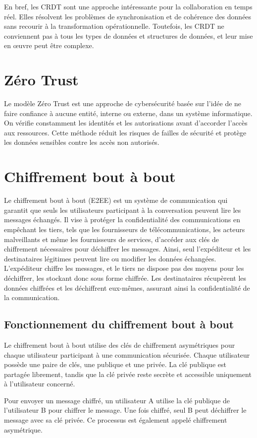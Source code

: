 En bref, les CRDT sont une approche intéressante pour la collaboration en temps réel. Elles résolvent les problèmes de synchronisation et de cohérence des données sans recourir à la transformation opérationnelle. Toutefois, les CRDT ne conviennent pas à tous les types de données et structures de données, et leur mise en œuvre peut être complexe.

\section{Zéro Trust}
Le modèle Zéro Trust est une approche de cybersécurité basée sur l'idée de ne faire confiance à aucune entité, interne ou externe, dans un système informatique. On vérifie constamment les identités et les autorisations avant d'accorder l'accès aux ressources. Cette méthode réduit les risques de failles de sécurité et protège les données sensibles contre les accès non autorisés.

\section{Chiffrement bout à bout}
Le chiffrement bout à bout (E2EE) est un système de communication qui garantit que seuls les utilisateurs participant à la conversation peuvent lire les messages échangés. Il vise à protéger la confidentialité des communications en empêchant les tiers, tels que les fournisseurs de télécommunications, les acteurs malveillants et même les fournisseurs de services, d'accéder aux clés de chiffrement nécessaires pour déchiffrer les messages. Ainsi, seul l'expéditeur et les destinataires légitimes peuvent lire ou modifier les données échangées. L'expéditeur chiffre les messages, et le tiers ne dispose pas des moyens pour les déchiffrer, les stockant donc sous forme chiffrée. Les destinataires récupèrent les données chiffrées et les déchiffrent eux-mêmes, assurant ainsi la confidentialité de la communication.
\subsection{Fonctionnement du chiffrement bout à bout}
Le chiffrement bout à bout utilise des clés de chiffrement asymétriques pour chaque utilisateur participant à une communication sécurisée. Chaque utilisateur possède une paire de clés, une publique et une privée. La clé publique est partagée librement, tandis que la clé privée reste secrète et accessible uniquement à l'utilisateur concerné.

Pour envoyer un message chiffré, un utilisateur A utilise la clé publique de l'utilisateur B pour chiffrer le message. Une fois chiffré, seul B peut déchiffrer le message avec sa clé privée. Ce processus est également appelé chiffrement asymétrique.

